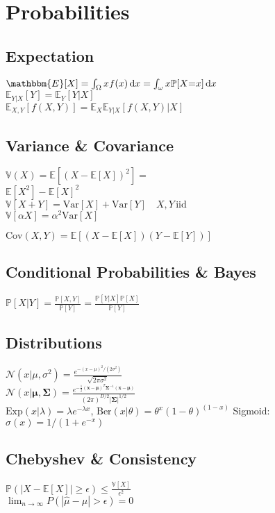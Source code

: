 \section*{Probabilities}
\subsection*{Expectation}
$\mathbbm{E}[X]=\int_{\Omega}xf(x)\di x=\int_{\omega}x\mathbb{P}[X{=}x]\di x$ \\
$\mathbb{E}_{Y|X}[Y]=\mathbb{E}_{Y}[Y|X]$\\
$\mathbb{E}_{X,Y}[f(X,Y)]=\mathbb{E}_{X}\mathbb{E}_{Y|X}[f(X,Y)|X]$

\subsection*{Variance \& Covariance}
$\mathbb{V}(X){=}\mathbb{E}[(X{-}\mathbb{E}[X])^2]{=}$ \\ $\mathbb{E}[X^2]{-}\mathbb{E}[X]^2$\\
$\mathbb{V}[X+Y]{=}\mathrm{Var}[X]+\mathrm{Var}[Y]\quad X,Y \,\text{iid}$\\
$\mathbb{V}[\alpha X]=\alpha^2\mathrm{Var}[X]$

$\mathrm{Cov}(X,Y)=\mathbb{E}[(X-\mathbb{E}[X])(Y-\mathbb{E}[Y])]$
\subsection*{Conditional Probabilities \& Bayes}
$\mathbb{P}[X|Y]=\frac{\mathbb{P}[X,Y]}{\mathbb{P}[Y]}=\frac{\mathbb{P}[Y|X]\mathbb{P}[X]}{\mathbb{P}[Y]}$
\subsection*{Distributions}
$\mathcal{N}(x|\mu, \sigma^2)=\frac{e^{-(x-\mu)^2/(2\sigma^2)}}{\sqrt{2\pi\sigma^2}}$\\
$\mathcal{N}(x|\bm{\mu}, \bm{\Sigma})= \frac{e^{-\frac{1}{2}(\mathbf{x}-\bm{\mu})^T\bm{\Sigma}^{-1}(\mathbf{x}-\bm{\mu})}}{(2\pi)^{D/2}|\bm{\Sigma}|^{1/2}} $\\
$\mathrm{Exp}(x|\lambda){=}\lambda e^{-\lambda x}$, $\mathrm{Ber}(x|\theta){=}\theta^x (1{-}\theta)^{(1-x)}$
Sigmoid: $\sigma(x)=1/(1+e^{-x})$

\subsection*{Chebyshev \& Consistency}
$\mathbb{P}(|X-\mathbb{E}[X]|\geq \epsilon)\leq \frac{\mathbb{V}[X]}{\epsilon^2}$\\
$\lim_{n\rightarrow\infty} P(|\hat{\mu}-\mu |>\epsilon)=0$


